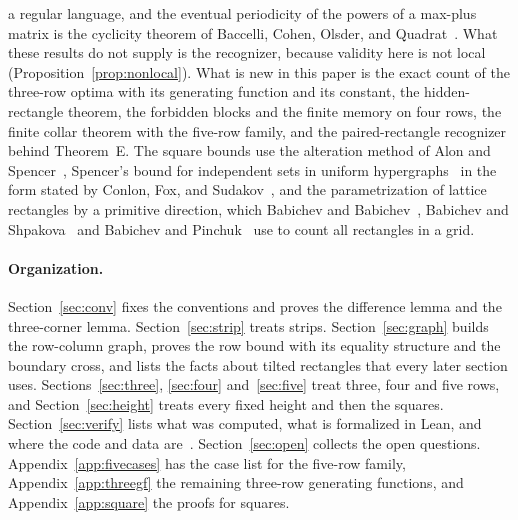 a regular language, and the eventual periodicity of the powers of a max-plus matrix
is the cyclicity theorem of Baccelli, Cohen, Olsder, and Quadrat~\cite{baccelli1992}.
What these results do not supply is the recognizer, because validity here is not
local (Proposition~\ref{prop:nonlocal}). What is new in this paper is the exact
count of the three-row optima with its generating function and its constant, the
hidden-rectangle theorem, the forbidden blocks and the finite memory on four rows,
the finite collar theorem with the five-row family, and the paired-rectangle
recognizer behind Theorem~E. The square bounds use the alteration method of Alon and
Spencer~\cite[Section~3.2]{alonspencer2016}, Spencer's bound for independent sets in
uniform hypergraphs~\cite{spencer1972} in the form stated by Conlon, Fox, and
Sudakov~\cite[Section~2]{conlonfoxsudakov2016}, and the parametrization of lattice
rectangles by a primitive direction, which Babichev and
Babichev~\cite{babichev2026mfcs}, Babichev and Shpakova~\cite{babichevshpakova2026}
and Babichev and Pinchuk~\cite{babichevpinchuk2026} use to count all rectangles in a
grid.

\paragraph{Organization.} Section~\ref{sec:conv} fixes the conventions and proves the
difference lemma and the three-corner lemma. Section~\ref{sec:strip} treats strips.
Section~\ref{sec:graph} builds the row-column graph, proves the row bound with its
equality structure and the boundary cross, and lists the facts about tilted
rectangles that every later section uses. Sections~\ref{sec:three}, \ref{sec:four}
and~\ref{sec:five} treat three, four and five rows, and Section~\ref{sec:height}
treats every fixed height and then the squares. Section~\ref{sec:verify} lists what
was computed, what is formalized in Lean, and where the code and data
are~\cite{repo}. Section~\ref{sec:open} collects the open questions.
Appendix~\ref{app:fivecases} has the case list for the five-row family,
Appendix~\ref{app:threegf} the remaining three-row generating functions, and
Appendix~\ref{app:square} the proofs for squares.

